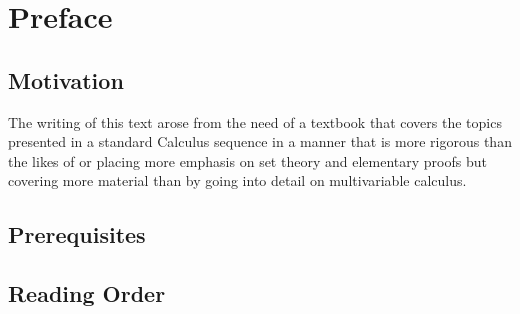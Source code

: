 \chapter*{Preface}

\section*{Motivation}

The writing of this text arose from the need of a textbook that covers the topics presented in a standard Calculus sequence in a manner that is more rigorous than the likes of \cite{stewartcalculus} or \cite{thomascalculus} placing more emphasis on set theory and elementary proofs but covering more material than \cite{spivakcalculus} by going into detail on multivariable calculus. 

\section*{Prerequisites}

\section*{Reading Order}

